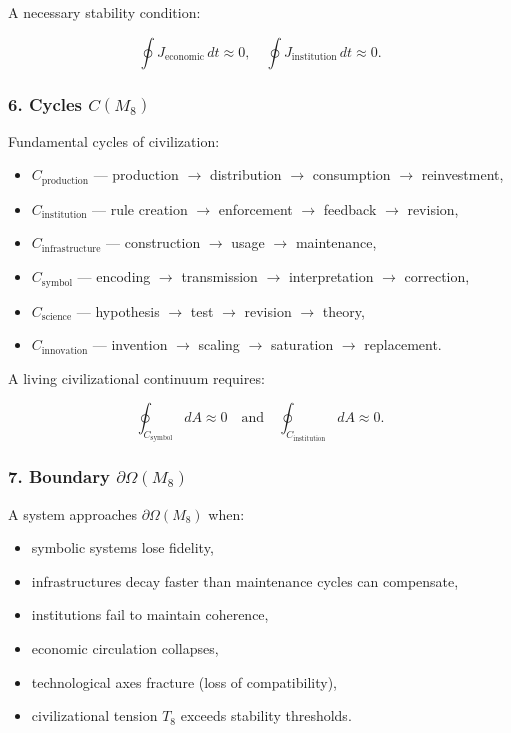 A necessary stability condition:

\[
\oint J_{\mathrm{economic}} \, dt \approx 0,
\quad
\oint J_{\mathrm{institution}} \, dt \approx 0.
\]

\subsubsection*{6. Cycles \texorpdfstring{$C(M_8)$}{C(M_8)}}

Fundamental cycles of civilization:

\begin{itemize}
    \item $C_{\mathrm{production}}$ — production $\to$ distribution $\to$ consumption $\to$ reinvestment,
    \item $C_{\mathrm{institution}}$ — rule creation $\to$ enforcement $\to$ feedback $\to$ revision,
    \item $C_{\mathrm{infrastructure}}$ — construction $\to$ usage $\to$ maintenance,
    \item $C_{\mathrm{symbol}}$ — encoding $\to$ transmission $\to$ interpretation $\to$ correction,
    \item $C_{\mathrm{science}}$ — hypothesis $\to$ test $\to$ revision $\to$ theory,
    \item $C_{\mathrm{innovation}}$ — invention $\to$ scaling $\to$ saturation $\to$ replacement.
\end{itemize}

A living civilizational continuum requires:

\[
\oint_{C_{\mathrm{symbol}}} dA \approx 0
\quad\text{and}\quad
\oint_{C_{\mathrm{institution}}} dA \approx 0.
\]

\subsubsection*{7. Boundary \texorpdfstring{$\partial\Omega(M_8)$}{\partial\Omega(M_8)}}

A system approaches $\partial\Omega(M_8)$ when:

\begin{itemize}
    \item symbolic systems lose fidelity,
    \item infrastructures decay faster than maintenance cycles can compensate,
    \item institutions fail to maintain coherence,
    \item economic circulation collapses,
    \item technological axes fracture (loss of compatibility),
    \item civilizational tension $T_8$ exceeds stability thresholds.
\end{itemize}

